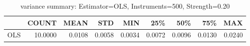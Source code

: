\begin{table}[ht]
\centering
\caption{variance summary: Estimator=OLS, Instruments=500, Strength=0.20}
\begin{tabular}{lrrrrrrrr}
\toprule
 & COUNT & MEAN & STD & MIN & 25\% & 50\% & 75\% & MAX \\
\midrule
OLS & 10.0000 & 0.0108 & 0.0058 & 0.0034 & 0.0072 & 0.0096 & 0.0130 & 0.0240 \\
\bottomrule
\end{tabular}
\end{table}
